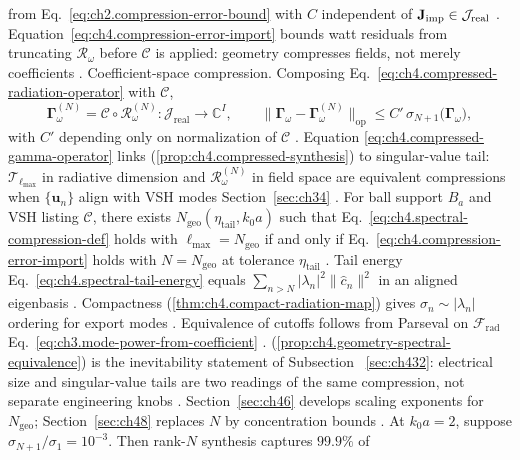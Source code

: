from Eq.~\eqref{eq:ch2.compression-error-bound} with \(C\) independent of \(\mathbf{J}_{\mathrm{imp}}\in\mathcal{J}_{\mathrm{real}}\)
\cite{harrington2001}. Equation~\eqref{eq:ch4.compression-error-import} bounds watt residuals from truncating
\(\mathcal{R}_\omega\) before \(\mathcal{C}\) is applied: geometry compresses fields, not merely coefficients
\cite{stratton1941}.
Coefficient-space compression. Composing Eq.~\eqref{eq:ch4.compressed-radiation-operator} with \(\mathcal{C}\),
\begin{equation}
\label{eq:ch4.compressed-gamma-operator}
\boldsymbol{\Gamma}_\omega^{(N)}
=
\mathcal{C}\circ\mathcal{R}_\omega^{(N)}:
\mathcal{J}_{\mathrm{real}}\to\mathbb{C}^{I},
\qquad
\|\boldsymbol{\Gamma}_\omega-\boldsymbol{\Gamma}_\omega^{(N)}\|_{\mathrm{op}}
\le
C'\,\sigma_{N+1}\!\big(\boldsymbol{\Gamma}_\omega\big),
\end{equation}
with \(C'\) depending only on normalization of \(\mathcal{C}\) \cite{hansen1988}. Equation
\eqref{eq:ch4.compressed-gamma-operator} links (\ref{prop:ch4.compressed-synthesis}) to singular-value
tail: \(\mathcal{T}_{\ell_{\max}}\) in radiative dimension and \(\mathcal{R}_\omega^{(N)}\) in field space are
equivalent compressions when \(\{\mathbf{u}_{n}\}\) align with VSH modes Section~\ref{sec:ch34}
\cite{stratton1941}.
\label{prop:ch4.geometry-spectral-equivalence}
For ball support \(B_{a}\) and VSH listing \(\mathcal{C}\), there exists \(N_{\mathrm{geo}}(\eta_{\mathrm{tail}},k_{0}a)\)
such that Eq.~\eqref{eq:ch4.spectral-compression-def} holds with \(\ell_{\max}=N_{\mathrm{geo}}\) if and only if
Eq.~\eqref{eq:ch4.compression-error-import} holds with \(N=N_{\mathrm{geo}}\) at tolerance \(\eta_{\mathrm{tail}}\)
\cite{stratton1941}.
Tail energy Eq.~\eqref{eq:ch4.spectral-tail-energy} equals \(\sum_{n>N}|\lambda_{n}|^{2}\|\widehat{c}_{n}\|^{2}\) in
an aligned eigenbasis \cite{hansen1988}. Compactness (\ref{thm:ch4.compact-radiation-map}) gives
\(\sigma_{n}\sim|\lambda_{n}|\) ordering for export modes \cite{harrington2001}. Equivalence of cutoffs follows
from Parseval on \(\mathcal{F}_{\mathrm{rad}}\) Eq.~\eqref{eq:ch3.mode-power-from-coefficient} \cite{stratton1941}.
(\ref{prop:ch4.geometry-spectral-equivalence}) is the inevitability statement of Subsection
~\ref{sec:ch432}: electrical size and singular-value tails are two readings of the same compression, not separate
engineering knobs \cite{devaney2004}. Section~\ref{sec:ch46} develops scaling exponents for
\(N_{\mathrm{geo}}\); Section~\ref{sec:ch48} replaces \(N\) by concentration bounds \cite{harrington2001}.
At \(k_{0}a=2\), suppose \(\sigma_{N+1}/\sigma_{1}=10^{-3}\). Then rank-\(N\) synthesis captures \(99.9\%\) of
